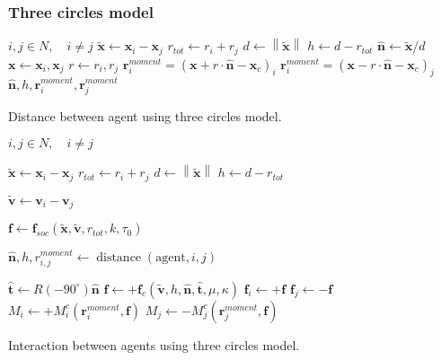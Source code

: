 \subsubsection{Three circles model}
\begin{algorithm}[H]
\begin{algorithmic}[1]
\REQUIRE $ i,j \in N, \quad i \neq j $
\ENSURE
{}
\STATE $ \tilde{\mathbf{x}} \gets \mathbf{x}_{i} - \mathbf{x}_{j} $
\STATE $ r_{tot} \gets r_{i} + r_{j} $ 
\STATE $ d \gets \left\|\tilde{\mathbf{x}}\right\| $
\STATE $ h \gets d - r_{tot} $
\STATE $ \hat{\mathbf{n}} \gets \tilde{\mathbf{x}} / d $
\STATE $ \mathbf{x} \gets \mathbf{x}_{i}, \mathbf{x}_{j} $
\STATE $ r \gets r_{i}, r_{j} $
\ENDIF
\ENDFOR
\ENDFOR
\STATE $ \mathbf{r}_{i}^{moment} = (\mathbf{x} + r \cdot \hat{\mathbf{n}} - \mathbf{x}_{c})_{i}  $
\STATE $ \mathbf{r}_{i}^{moment} = (\mathbf{x} - r \cdot \hat{\mathbf{n}} - \mathbf{x}_{c})_{j}  $
\RETURN $ \hat{\mathbf{n}}, h, \mathbf{r}_{i}^{moment}, \mathbf{r}_{j}^{moment} $
\end{algorithmic}
\caption{Distance between agent using three circles model.}
\end{algorithm}


\begin{algorithm}[H]
\begin{algorithmic}[1]
\REQUIRE $ i,j \in N, \quad i \neq j $
\ENSURE

\STATE $ \tilde{\mathbf{x}} \gets \mathbf{x}_{i} - \mathbf{x}_{j} $
\STATE $ r_{tot} \gets r_{i} + r_{j} $ 
\STATE $ d \gets \left\|\tilde{\mathbf{x}}\right\| $
\STATE $ h \gets d - r_{tot} $
\STATE 

\STATE $ \tilde{\mathbf{v}} \gets \mathbf{v}_{i} - \mathbf{v}_{j} $

\STATE $ \mathbf{f} \gets \mathbf{f}_{soc}(\tilde{\mathbf{x}}, \tilde{\mathbf{v}}, r_{tot}, k, \tau_{0}) $

\STATE $ \hat{\mathbf{n}}, h, r_{i,j}^{moment} \gets \operatorname{distance}(\mathrm{agent}, i, j) $

\STATE $ \hat{\mathbf{t}} \gets R(-90^{\circ}) \hat{\mathbf{n}} $
\STATE $ \mathbf{f} \gets +\mathbf{f}_{c}(\tilde{\mathbf{v}}, h, \hat{\mathbf{n}}, \hat{\mathbf{t}}, \mu, \kappa) $
\ENDIF
\STATE $ \mathbf{f}_{i} \gets +\mathbf{f} $
\STATE $ \mathbf{f}_{j} \gets -\mathbf{f} $
\STATE $ M_{i} \gets +M_{i}^{c}(\mathbf{r}_{i}^{moment}, \mathbf{f}) $
\STATE $ M_{j} \gets -M_{j}^{c}(\mathbf{r}_{j}^{moment}, \mathbf{f}) $
\ENDIF

\ENDIF
\end{algorithmic}
\caption{Interaction between agents using three circles model.}
\end{algorithm}
